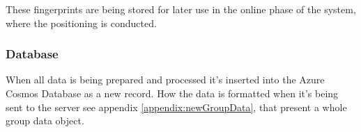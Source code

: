 
These fingerprints are being stored for later use in the online phase of the system, where the positioning is conducted.



\subsubsection{Database}\label{sec:implServerGroupCreationDatabase}
When all data is being prepared and processed it's inserted into the Azure Cosmos Database as a new record.
How the data is formatted when it's being sent to the server see appendix \ref{appendix:newGroupData}, that present a whole group data object.
